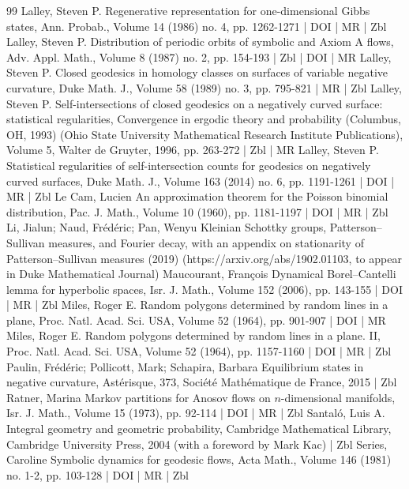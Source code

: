 \begin{thebibliography}{99}
Lalley, Steven P. Regenerative representation for one-dimensional Gibbs states, Ann. Probab., Volume 14 (1986) no. 4, pp. 1262-1271 | DOI | MR | Zbl
Lalley, Steven P. Distribution of periodic orbits of symbolic and Axiom A flows, Adv. Appl. Math., Volume 8 (1987) no. 2, pp. 154-193 | Zbl | DOI | MR
Lalley, Steven P. Closed geodesics in homology classes on surfaces of variable negative curvature, Duke Math. J., Volume 58 (1989) no. 3, pp. 795-821 | MR | Zbl
Lalley, Steven P. Self-intersections of closed geodesics on a negatively curved surface: statistical regularities, Convergence in ergodic theory and probability (Columbus, OH, 1993) (Ohio State University Mathematical Research Institute Publications), Volume 5, Walter de Gruyter, 1996, pp. 263-272 | Zbl | MR
Lalley, Steven P. Statistical regularities of self-intersection counts for geodesics on negatively curved surfaces, Duke Math. J., Volume 163 (2014) no. 6, pp. 1191-1261 | DOI | MR | Zbl
Le Cam, Lucien An approximation theorem for the Poisson binomial distribution, Pac. J. Math., Volume 10 (1960), pp. 1181-1197 | DOI | MR | Zbl
Li, Jialun; Naud, Frédéric; Pan, Wenyu Kleinian Schottky groups, Patterson–Sullivan measures, and Fourier decay, with an appendix on stationarity of Patterson–Sullivan measures (2019) (https://arxiv.org/abs/1902.01103, to appear in Duke Mathematical Journal)
Maucourant, François Dynamical Borel–Cantelli lemma for hyperbolic spaces, Isr. J. Math., Volume 152 (2006), pp. 143-155 | DOI | MR | Zbl
Miles, Roger E. Random polygons determined by random lines in a plane, Proc. Natl. Acad. Sci. USA, Volume 52 (1964), pp. 901-907 | DOI | MR
Miles, Roger E. Random polygons determined by random lines in a plane. II, Proc. Natl. Acad. Sci. USA, Volume 52 (1964), pp. 1157-1160 | DOI | MR | Zbl
Paulin, Frédéric; Pollicott, Mark; Schapira, Barbara Equilibrium states in negative curvature, Astérisque, 373, Société Mathématique de France, 2015 | Zbl
Ratner, Marina Markov partitions for Anosov flows on $n$-dimensional manifolds, Isr. J. Math., Volume 15 (1973), pp. 92-114 | DOI | MR | Zbl
Santaló, Luis A. Integral geometry and geometric probability, Cambridge Mathematical Library, Cambridge University Press, 2004 (with a foreword by Mark Kac) | Zbl
Series, Caroline Symbolic dynamics for geodesic flows, Acta Math., Volume 146 (1981) no. 1-2, pp. 103-128 | DOI | MR | Zbl

\end{thebibliography}
